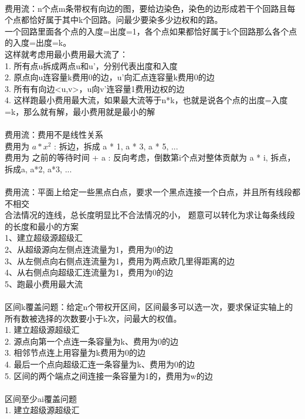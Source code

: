 \documentclass[10pt]{ctexart}
\begin{document}
{\\
费用流：n个点m条带权有向边的图，要给边染色，染色的边形成若干个回路且每个点都恰好属于其中k个回路。问最少要染多少边权和的路。\\
一个回路里面各个点的入度=出度=1，各个点如果都恰好属于k个回路那么各个点的入度=出度=k。\\
这样就考虑用最小费用最大流了：\\
1. 所有点u拆成两点u和u'，分别代表出度和入度\\
2. 原点向u连容量k费用0的边，u'向汇点连容量k费用0的边\\
3. 所有有向边<u,v>，u向v'连容量1费用边权的边\\
4. 这样跑最小费用最大流，如果最大流等于n*k，也就是说各个点的出度=入度=k，那么就有解，最小费用就是最小的解\\
\\
费用流：费用不是线性关系\\
费用为 $a * x^2$ : 拆边，拆成 a * 1, a * 3, a * 5, ...\\
费用为 之前的等待时间 + a : 反向考虑，倒数第i个点对整体贡献为 a * i, 拆点，拆成a, a*2, a*3, ...\\
\\
费用流：平面上给定一些黑点白点，要求一个黑点连接一个白点，并且所有线段都不相交\\
合法情况的连线，总长度明显比不合法情况的小， 题意可以转化为求让每条线段的长度和最小的方案\\
1、建立超级源超级汇\\
2、从超级源向左侧点连流量为1，费用为0的边\\
3、从左侧点向右侧点连流量为1，费用为两点欧几里得距离的边\\
4、从右侧点向超级汇连流量为1，费用为0的边\\
5、跑最小费用最大流\\
\\
区间k覆盖问题：给定n个带权开区间，区间最多可以选一次，要求保证实轴上的所有数被选择的次数要小于k次，问最大的权值。\\
1. 建立超级源超级汇\\
2. 源点向第一个点连一条容量为k、费用为0的边\\
3. 相邻节点连上用容量为k费用为0的边\\
4. 最后一个点向超级汇连一条容量为k、费用为0的边\\
5. 区间的两个端点之间连接一条容量为1的，费用为w的边\\
\\
区间至少ai覆盖问题\\
1. 建立超级源超级汇\\
}
\end{document}
